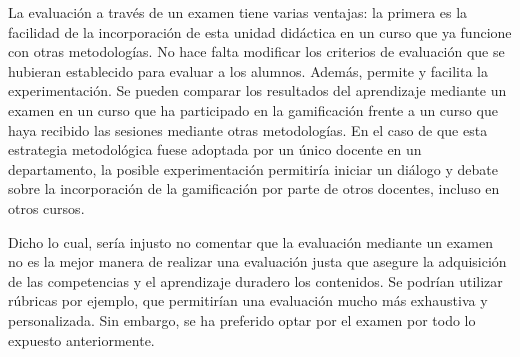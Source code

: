 La evaluación a través de un examen tiene varias ventajas:
%
la primera es la facilidad de la incorporación de esta unidad didáctica en un curso que ya funcione con otras metodologías.
%
No hace falta modificar los criterios de evaluación que se hubieran establecido para evaluar a los alumnos.
%
Además, permite y facilita la experimentación.
%
Se pueden comparar los resultados del aprendizaje mediante un examen en un curso que ha participado en la gamificación frente a un curso que haya recibido las sesiones mediante otras metodologías.
%
En el caso de que esta estrategia metodológica fuese adoptada por un único docente en un departamento, la posible experimentación permitiría iniciar un diálogo y debate sobre la incorporación de la gamificación por parte de otros docentes, incluso en otros cursos.

Dicho lo cual, sería injusto no comentar que la evaluación mediante un examen no es la mejor manera de realizar una evaluación justa que asegure la adquisición de las competencias y el aprendizaje duradero los contenidos.
%
Se podrían utilizar rúbricas por ejemplo, que permitirían una evaluación mucho más exhaustiva y personalizada.
%
Sin embargo, se ha preferido optar por el examen por todo lo expuesto anteriormente.



